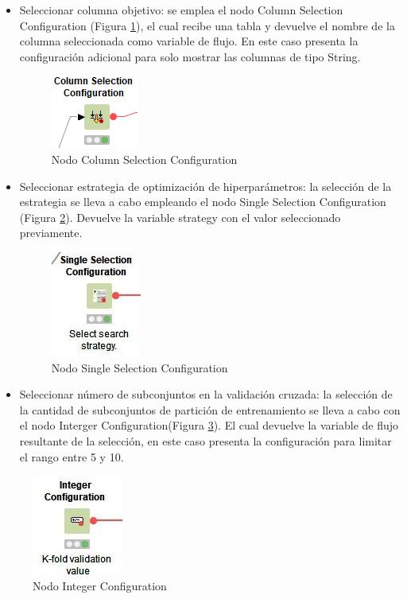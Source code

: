 \begin{itemize}
	\item Seleccionar columna objetivo: se emplea el nodo Column Selection Configuration (Figura \ref{fig:nodo-column-select-conf}), el cual recibe una tabla y devuelve el nombre de la columna seleccionada como variable de flujo. En este caso presenta la configuración adicional para solo mostrar las columnas de tipo String.
	\begin{figure}[H]
		\centering
		\includegraphics[width=0.15\linewidth]{"figuras/capi 2/nodo-column-select-conf"}
		\caption[Nodo Column Selection Configuration]{Nodo Column Selection Configuration}
		\label{fig:nodo-column-select-conf}
	\end{figure}
	
	\item Seleccionar estrategia de optimización de hiperparámetros: la selección de la estrategia se lleva a cabo empleando el nodo Single Selection Configuration (Figura \ref{fig:nodo-single-select-conf}). Devuelve la variable strategy con el valor seleccionado previamente.
	\begin{figure}[H]
		\centering
		\includegraphics[width=0.15\linewidth]{"figuras/capi 2/nodo-single-select-conf"}
		\caption[Nodo Single Selection Configuration]{Nodo Single Selection Configuration}
		\label{fig:nodo-single-select-conf}
	\end{figure}
	
	\item Seleccionar número de subconjuntos en la validación cruzada: la selección de la cantidad de subconjuntos de partición de entrenamiento se lleva a cabo con el nodo Interger Configuration(Figura \ref{fig:nodo-int-conf}). El cual devuelve la variable de flujo resultante de la selección, en este caso presenta la configuración para limitar el rango entre 5 y 10.
\end{itemize}
\begin{figure}[H]
	\centering
	\includegraphics[width=0.15\linewidth]{"figuras/capi 2/nodo-int-conf"}
	\caption[Nodo Integer Configuration]{Nodo Integer Configuration}
	\label{fig:nodo-int-conf}
\end{figure}

